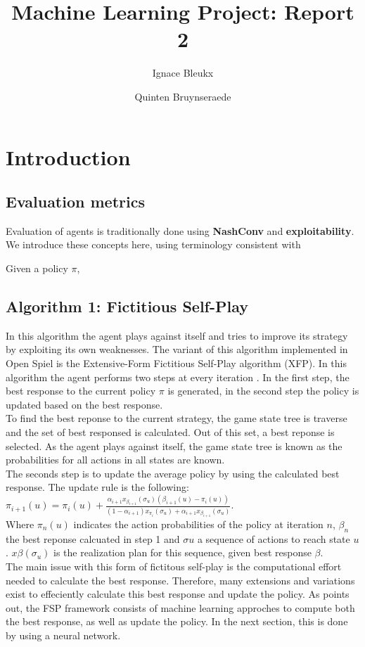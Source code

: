\documentclass[10pt,a4paper]{article}
\title{Machine Learning Project: Report 2}
\author{Ignace Bleukx \and Quinten Bruynseraede}
\begin{document}
\maketitle
\section{Introduction}
\subsection{Evaluation metrics}
Evaluation of agents is traditionally done using \textbf{NashConv} and \textbf{exploitability}. We introduce these concepts here, using terminology consistent with 

Given a policy $\pi$,
\subsection{Algorithm 1: Fictitious Self-Play}
In this algorithm the agent plays against itself and tries to improve its strategy by exploiting its own weaknesses. The variant of this algorithm implemented in Open Spiel is the Extensive-Form Fictitious Self-Play algorithm (XFP). In this algorithm the agent performs two steps at every iteration \citep{fsp-ext}. In the first step, the best response to the current policy $\pi$ is generated, in the second step the policy is updated based on the best response.\\
To find the best reponse to the current strategy, the game state tree is traverse and the set of best responsed is calculated. Out of this set, a best reponse is selected. As the agent plays against itself, the game state tree is known as the probabilities for all actions in all states are known.\\
The seconds step is to update the average policy by using the calculated best response. The update rule is the following:
\begin{math}
\pi_{i+1}(u) = \pi_{i}(u) + \frac{\alpha_{i+1}x_{\beta_{i+1}}(\sigma_{u})(\beta_{i+1}(u) - \pi_i(u))}{(1-\alpha_{i+1})x_{\pi_i}(\sigma_{u}) + \alpha_{i+1}x_{\beta_{i+1}}(\sigma_u)}
\end{math}.\\
Where $\pi_n(u)$ indicates the action probabilities of the policy at iteration $n$, $\beta_n$ the best reponse calcuated in step 1 and $\sigma{u}$ a sequence of actions to reach state $u$. $x{\beta}(\sigma_u)$ is the realization plan for this sequence, given best response $\beta$.\\
The main issue with this form of fictitous self-play is the computational effort needed to calculate the best response. Therefore, many extensions and variations exist to effeciently calculate this best response and update the policy. As \cite{fsp-ext} points out, the FSP framework consists of machine learning approches to compute both the best response, as well as update the policy. 
In the next section, this is done by using a neural network.
\end{document}
